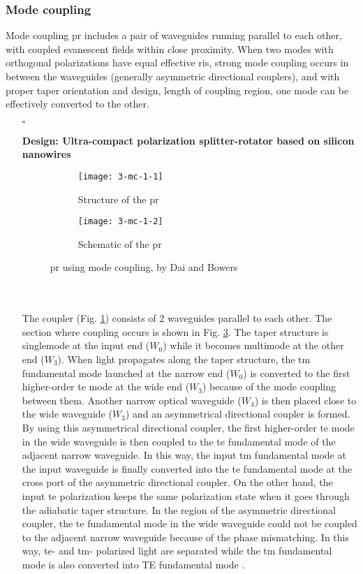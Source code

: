 \documentclass[../report.tex]{subfiles}
\begin{document}
			\subsubsection{Mode coupling} Mode coupling \gls{pr} includes a pair of waveguides running parallel to each other, with coupled evanescent fields within close proximity. When two modes with orthogonal polarizations have equal effective \gls{ri}s, strong mode coupling occurs in between the waveguides (generally asymmetric directional couplers), and with proper taper orientation and design, length of coupling region, one mode can be effectively converted to the other.
\begin{itemize}[leftmargin=*]
	\item[$\square$] \begin{minipage}[t]{\textwidth}\textbf{Design: Ultra-compact polarization splitter-rotator based on silicon nanowires}
	\begin{figure}[H] %
		\begin{subfigure}[t]{0.45\textwidth}
			\texttt{[image: 3-mc-1-1]}
			\caption{Structure of the \gls{pr}}
			\label{fig:3_mc_1_1}
		\end{subfigure}
		\hfill
		\begin{subfigure}[t]{0.45\textwidth}
			\texttt{[image: 3-mc-1-2]}
			\caption{Schematic of the \gls{pr}}
			\label{fig:3_mc_1_2}
		\end{subfigure}
		\caption{\gls{pr} using mode coupling, by Dai and Bowers \cite{dai_novel_2011}}
	\end{figure}
	\end{minipage}\\\\
	\noindent The coupler (Fig. \ref{fig:3_mc_1_1}) consists of 2 waveguides parallel to each other. The section where coupling occurs is shown in Fig. \ref{fig:3_mc_1_2}. The taper structure is singlemode at the input end ($W_0$) while it becomes multimode at the other end ($W_3$). When light propagates along the taper structure, the \gls{tm} fundamental mode launched at the narrow end ($W_0$) is converted to the first higher-order \gls{te} mode at the wide end ($W_3$) because of the mode coupling between them. Another narrow optical waveguide ($W_4$) is then placed close to the wide waveguide ($W_3$) and an asymmetrical directional coupler is formed. By using this asymmetrical directional coupler, the first higher-order \gls{te} mode in the wide waveguide is then coupled to the \gls{te} fundamental mode of the adjacent narrow waveguide. In this way, the input \gls{tm} fundamental mode at the input waveguide is finally converted into the \gls{te} fundamental mode at the cross port of the asymmetric directional coupler. On the other hand, the input \gls{te} polarization keeps the same polarization state when it goes through the adiabatic taper structure. In the region of the asymmetric directional coupler, the \gls{te} fundamental mode in the wide waveguide could not be coupled to the adjacent narrow waveguide because of the phase mismatching. In this way, \gls{te}- and \gls{tm}- polarized light are separated while the \gls{tm} fundamental mode is also converted into TE fundamental mode \cite{dai_novel_2011}.\par	


\end{itemize}
\end{document}
